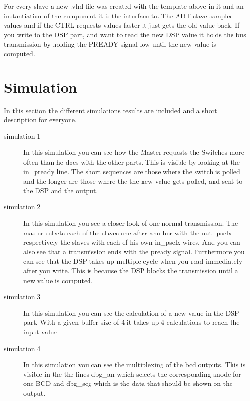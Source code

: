 \documentclass[%
	a4paper,
]
{article}
\begin{document}
For every slave a new .vhd file was created with the template above in it and an 
instantiation of the component it is the interface to. The ADT slave samples values
and if the CTRL requests values faster it just gets the old value back. If you write
to the DSP part, and want to read the new DSP value it holds the bus transmission by 
holding the PREADY signal low until the new value is computed.



\section{Simulation}
In this section the different simulations results are included and a short description for
everyone.

\begin{description}


\item[simulation 1] In this simulation you can see how the Master requests the Switches more often than he does
with the other parts. This is visible by looking at the in\_pready line. The short sequences are
those where the switch is polled and the longer are those where the the new value gets polled,
and sent to the DSP and the output.

\item[simulation 2] In this simulation you see a closer look of one normal transmission. The master
selects each of the slaves one after another with the out\_pselx respectively the slaves with each 
of his own in\_pselx wires. And you can also see that a transmission ends with the pready signal. 
Furthermore you can see that the DSP takes up multiple cycle when you read immediately after you
write. This is because the DSP blocks the transmission until a new value is computed.

\item[simulation 3] In this simulation you can see the calculation of a new value in the 
DSP part. With a given buffer size of 4 it takes up 4 calculations to reach the input value.

\item[simulation 4] In this simulation you can see the multiplexing of the bcd outputs. This
is visible in the the lines dbg\_an which selects the corresponding anode for one BCD and 
dbg\_seg which is the data that should be shown on the output.
\end{description}
\newpage

\end{document}
